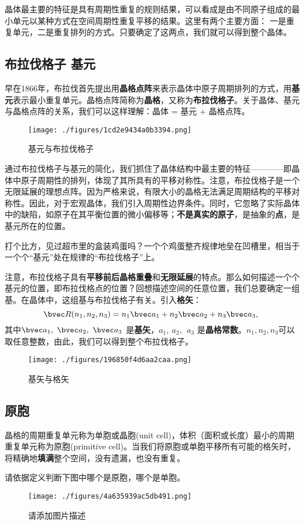 
晶体最主要的特征是具有周期性重复的规则结果，可以看成是由不同原子组成的最小单元以某种方式在空间周期性重复平移的结果。这里有两个主要方面：
一是重复单元，二是重复排列的方式。只要确定了这两点，我们就可以得到整个晶体。

\subsection{布拉伐格子 基元}
早在1866年，布拉伐首先提出用\textbf{晶格点阵}来表示晶体中原子周期排列的方式，用\textbf{基元}表示最小重复单元。晶格点阵简称为\textbf{晶格}，又称为\textbf{布拉伐格子}。关于晶体、基元与晶格点阵的关系，我们可以这样理解：晶体 = 基元 + 晶格点阵。
\begin{figure}[ht]
\centering
\texttt{[image: ./figures/1cd2e9434a0b3394.png]}
\caption{基元与布拉伐格子} \label{fig_BraLat_1}
\end{figure}

通过布拉伐格子与基元的简化，我们抓住了晶体结构中最主要的特征————即晶体中原子周期性的排列，体现了其所具有的平移对称性。注意，布拉伐格子是一个无限延展的理想点阵。因为严格来说，有限大小的晶格无法满足周期结构的平移对称性。因此，对于宏观晶体，我们引入周期性边界条件。同时，它忽略了实际晶体中的缺陷，如原子在其平衡位置的微小偏移等；\textbf{不是真实的原子}，是抽象的\textbf{点}，是基元所在的位置。

打个比方，见过超市里的盒装鸡蛋吗？一个个鸡蛋整齐规律地垒在凹槽里，相当于一个个“基元”处在规律的“布拉伐格子”上。

注意，布拉伐格子具有\textbf{平移前后晶格重叠}和\textbf{无限延展}的特点。那么如何描述一个个基元的位置，即布拉伐格点的位置？回想描述空间的任意位置，我们总要确定一组基。在晶体中，这组基与布拉伐格子有关。引入\textbf{格矢}：
\begin{equation}
\bvec R(n_1, n_2, n_3) = n_1 \bvec a_1 + n_2 \bvec a_2 + n_3 \bvec a_3,~ 
\end{equation}
其中$\bvec a_1,~\bvec a_2,~\bvec a_3$ 是\textbf{基矢}，$a_1,~ a_2,~\ a_3$ 是\textbf{晶格常数}。$n_1, n_2, n_3$可以取任意整数，由此，我们可以得到整个布拉伐格子。

\begin{figure}[ht]
\centering
\texttt{[image: ./figures/196850f4d6aa2caa.png]}
\caption{基矢与格矢} \label{fig_BraLat_2}
\end{figure}

\subsection{原胞}
晶格的周期重复单元称为单胞或晶胞(unit cell)，体积（面积或长度）最小的周期重复单元称为原胞(primitive cell)。当我们将原胞或单胞平移所有可能的格矢时，将精确地\textbf{填满}整个空间，没有遗漏，也没有重复。
\begin{exercise}{}
请依据定义判断下图中哪个是原胞，哪个是单胞。
\begin{figure}[ht]
\centering
\texttt{[image: ./figures/4a635939ac5db491.png]}
\caption{请添加图片描述} \label{fig_BraLat_6}
\end{figure}
\end{exercise}

